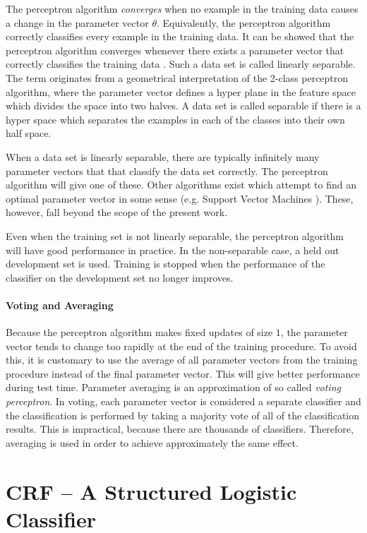 The perceptron algorithm {\it converges} when no example in the
training data causes a change in the parameter vector
$\theta$. Equivalently, the perceptron algorithm correctly classifies
every example in the training data. It can be showed that the
perceptron algorithm converges whenever there exists a parameter vector
that correctly classifies the training data \citep{Freund1999}. Such a
data set is called linearly separable. The term originates from a
geometrical interpretation of the 2-class perceptron algorithm, where
the parameter vector defines a hyper plane in the feature space which
divides the space into two halves. A data set is called separable if
there is a hyper space which separates the examples in each of the
classes into their own half space.

When a data set is linearly separable, there are typically infinitely
many parameter vectors that that classify the data set correctly. The
perceptron algorithm will give one of these. Other algorithms exist
which attempt to find an optimal parameter vector in some sense
(e.g. Support Vector Machines \citep{Cortes1995}). These, however,
fall beyond the scope of the present work.

Even when the training set is not linearly separable, the perceptron
algorithm will have good performance in practice. In the non-separable
case, a held out development set is used. Training is stopped when the
performance of the classifier on the development set no longer
improves.

\paragraph{Voting and Averaging} Because the perceptron algorithm
makes fixed updates of size $1$, the parameter vector tends to change
too rapidly at the end of the training procedure. To avoid this, it is
customary to use the average of all parameter vectors from the
training procedure instead of the final parameter vector. This will
give better performance during test time. Parameter averaging is an
approximation of so called {\it voting perceptron}. In voting, each
parameter vector is considered a separate classifier and the
classification is performed by taking a majority vote of all of the
classification results. This is impractical, because there are
thousands of classifiers. Therefore, averaging is used in order to
achieve approximately the same effect.%

\section{CRF -- A Structured Logistic Classifier}\label{sec:crf}

